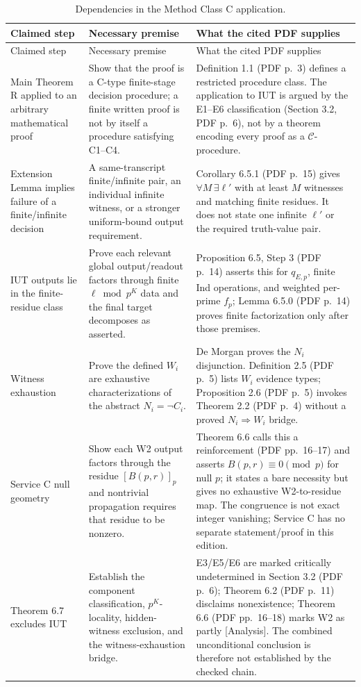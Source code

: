 \documentclass[11pt]{article}
\begin{document}
\begin{longtable}{p{}p{}p{}}
\caption{Dependencies in the Method Class C application.}\label{tab:hayashi}\\
\toprule Claimed step & Necessary premise & What the cited PDF supplies\\\midrule
\endfirsthead
\toprule Claimed step & Necessary premise & What the cited PDF supplies\\\midrule
\endhead
Main Theorem R applied to an arbitrary mathematical proof & Show that the proof is a C-type finite-stage decision procedure; a finite written proof is not by itself a procedure satisfying C1--C4. & Definition 1.1 (PDF p.~3) defines a restricted procedure class. The application to IUT is argued by the E1--E6 classification (Section 3.2, PDF p.~6), not by a theorem encoding every proof as a $\mathcal C$-procedure.\\\addlinespace
Extension Lemma implies failure of a finite/infinite decision & A same-transcript finite/infinite pair, an individual infinite witness, or a stronger uniform-bound output requirement. & Corollary 6.5.1 (PDF p.~15) gives $\forall M\,\exists\ell'$ with at least $M$ witnesses and matching finite residues. It does not state one infinite $\ell'$ or the required truth-value pair.\\\addlinespace
IUT outputs lie in the finite-residue class & Prove each relevant global output/readout factors through finite $\ell\bmod p^K$ data and the final target decomposes as asserted. & Proposition 6.5, Step 3 (PDF p.~14) asserts this for $q_{E,p}$, finite Ind operations, and weighted per-prime $f_p$; Lemma 6.5.0 (PDF p.~14) proves finite factorization only after those premises.\\\addlinespace
Witness exhaustion & Prove the defined $W_i$ are exhaustive characterizations of the abstract $N_i=\neg C_i$. & De Morgan proves the $N_i$ disjunction. Definition 2.5 (PDF p.~5) lists $W_i$ evidence types; Proposition 2.6 (PDF p.~5) invokes Theorem 2.2 (PDF p.~4) without a proved $N_i\Rightarrow W_i$ bridge.\\\addlinespace
Service C null geometry & Show each W2 output factors through the residue $[B(p,r)]_p$ and nontrivial propagation requires that residue to be nonzero. & Theorem 6.6 calls this a reinforcement (PDF pp.~16--17) and asserts $B(p,r)\equiv0\pmod p$ for null $p$; it states a bare necessity but gives no exhaustive W2-to-residue map. The congruence is not exact integer vanishing; Service C has no separate statement/proof in this edition.\\\addlinespace
Theorem 6.7 excludes IUT & Establish the component classification, $p^K$-locality, hidden-witness exclusion, and the witness-exhaustion bridge. & E3/E5/E6 are marked critically undetermined in Section 3.2 (PDF p.~6); Theorem 6.2 (PDF p.~11) disclaims nonexistence; Theorem 6.6 (PDF pp.~16--18) marks W2 as partly [Analysis]. The combined unconditional conclusion is therefore not established by the checked chain.\\
\bottomrule
\end{longtable}
\end{document}
